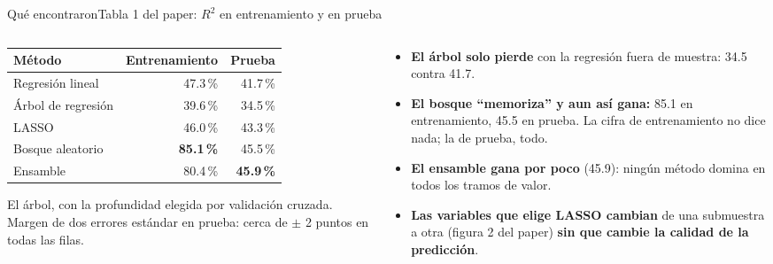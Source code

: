 \documentclass{beamer}
\begin{document}
\begin{frame}{Qué encontraron}{Tabla 1 del paper: $R^2$ en entrenamiento y en prueba}
\begin{columns}[T]
\begin{column}{0.54\textwidth}
{\scriptsize\setlength{\tabcolsep}{4pt}
\begin{tabular}{@{}lrr@{}}
\toprule
Método & Entrenamiento & Prueba \\
\midrule
Regresión lineal & 47.3\,\% & 41.7\,\% \\
Árbol de regresión & 39.6\,\% & 34.5\,\% \\
LASSO & 46.0\,\% & 43.3\,\% \\
Bosque aleatorio & \textbf{85.1\,\%} & 45.5\,\% \\
Ensamble & 80.4\,\% & \textbf{45.9\,\%} \\
\bottomrule
\end{tabular}}
\smallskip

{\scriptsize El árbol, con la profundidad elegida por validación cruzada. Margen de dos errores estándar en prueba: cerca de $\pm$ 2 puntos en todas las filas.}
\end{column}
\begin{column}{0.46\textwidth}
\footnotesize
\begin{itemize}\itemsep3pt
  \item \textbf{El árbol solo pierde} con la regresión fuera de muestra: 34.5 contra 41.7.
  \item \textbf{El bosque ``memoriza'' y aun así gana:} 85.1 en entrenamiento, 45.5 en prueba. La cifra de entrenamiento no dice nada; la de prueba, todo.
  \item \textbf{El ensamble gana por poco} (45.9): ningún método domina en todos los tramos de valor.
  \item \textbf{Las variables que elige LASSO cambian} de una submuestra a otra (figura 2 del paper) \textbf{sin que cambie la calidad de la predicción}.
\end{itemize}
\end{column}
\end{columns}
\end{frame}
\end{document}
